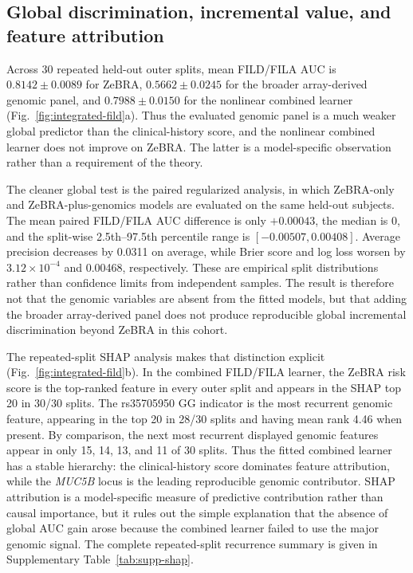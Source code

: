 \subsection{Global discrimination, incremental value, and feature attribution}
Across 30 repeated held-out outer splits, mean FILD/FILA AUC is $0.8142\pm0.0089$ for ZeBRA, $0.5662\pm0.0245$ for the broader array-derived genomic panel, and $0.7988\pm0.0150$ for the nonlinear combined learner (Fig.~\ref{fig:integrated-fild}a). Thus the evaluated genomic panel is a much weaker global predictor than the clinical-history score, and the nonlinear combined learner does not improve on ZeBRA. The latter is a model-specific observation rather than a requirement of the theory.

The cleaner global test is the paired regularized analysis, in which ZeBRA-only and ZeBRA-plus-genomics models are evaluated on the same held-out subjects. The mean paired FILD/FILA AUC difference is only $+0.00043$, the median is 0, and the split-wise 2.5th--97.5th percentile range is $[-0.00507,0.00408]$. Average precision decreases by 0.0311 on average, while Brier score and log loss worsen by $3.12\times10^{-4}$ and 0.00468, respectively. These are empirical split distributions rather than confidence limits from independent samples. The result is therefore not that the genomic variables are absent from the fitted models, but that adding the broader array-derived panel does not produce reproducible global incremental discrimination beyond ZeBRA in this cohort.

The repeated-split SHAP analysis makes that distinction explicit (Fig.~\ref{fig:integrated-fild}b). In the combined FILD/FILA learner, the ZeBRA risk score is the top-ranked feature in every outer split and appears in the SHAP top 20 in 30/30 splits. The rs35705950 GG indicator is the most recurrent genomic feature, appearing in the top 20 in 28/30 splits and having mean rank 4.46 when present. By comparison, the next most recurrent displayed genomic features appear in only 15, 14, 13, and 11 of 30 splits. Thus the fitted combined learner has a stable hierarchy: the clinical-history score dominates feature attribution, while the \textit{MUC5B} locus is the leading reproducible genomic contributor. SHAP attribution is a model-specific measure of predictive contribution rather than causal importance, but it rules out the simple explanation that the absence of global AUC gain arose because the combined learner failed to use the major genomic signal. The complete repeated-split recurrence summary is given in Supplementary Table~\ref{tab:supp-shap}.


